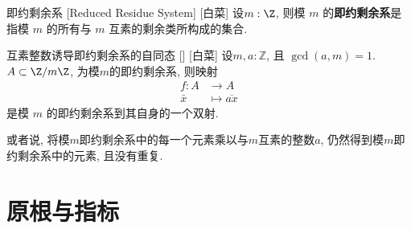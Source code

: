 \documentclass[UTF8]{ctexart}
\begin{document}
            \begin{dfn}
                [ReducedResidueSystem]
                {即约剩余系}
                [Reduced Residue System]
                [白菜]
                设\(m:\Z\), 则模 \(m\) 的\textbf{即约剩余系}是指模 \(m\) 的所有与 \(m\) 互素的剩余类所构成的集合.
            \end{dfn}

            \begin{thm}
                []
                {互素整数诱导即约剩余系的自同态}
                []
                [白菜]
                设\(m, a:\mathbb{Z}\), 且 \(\gcd(a,m)=1\). \(A\subset \Z/m\Z\), 为模\(m\)的即约剩余系, 则映射
                \[ 
                    \begin{aligned}
                        f: A &\to A\\
                        \bar{x} &\mapsto \overline{ax}
                    \end{aligned}
                \]
                是模 \(m\) 的即约剩余系到其自身的一个双射.
            \end{thm}

            \begin{rmk}
                或者说, 将模\(m\)即约剩余系中的每一个元素乘以与\(m\)互素的整数\(a\), 仍然得到模\(m\)即约剩余系中的元素, 且没有重复.
            \end{rmk}
    \section{原根与指标}
        
        
\end{document}
